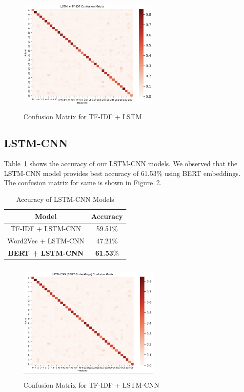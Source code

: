 \documentclass[conference]{IEEEtran}
\begin{document}
\begin{figure}[!htb]
\centering
\includegraphics[width=70mm, height = 60mm]{Images/LSTM.png}
\caption{Confusion Matrix for TF-IDF + LSTM}\label{fig:lstm}
\end{figure}

\subsection{LSTM-CNN}

Table~\ref{tab: lstm_cnn_models} shows the accuracy of our LSTM-CNN models. We observed that the LSTM-CNN model provides best accuracy of 61.53\% using BERT embeddings. The confusion matrix for same is shown in Figure~\ref{fig:lstm_cnn}.

\begin{table}[!htb]
\centering
\caption{Accuracy of LSTM-CNN Models}
\label{tab: lstm_cnn_models}
\begin{tabular}{c|c}\midrule\midrule
Model & Accuracy\\ \midrule
TF-IDF + LSTM-CNN & 59.51\% \\
Word2Vec + LSTM-CNN & 47.21\% \\
\textbf{BERT + LSTM-CNN} & \textbf{61.53}\% \\ \midrule\midrule
\end{tabular}
\end{table}

\begin{figure}[!htb]
\centering
\includegraphics[width=70mm, height = 60mm]{Images/LSTM-CNN.png}
\caption{Confusion Matrix for TF-IDF + LSTM-CNN}\label{fig:lstm_cnn}
\end{figure}
\end{document}
